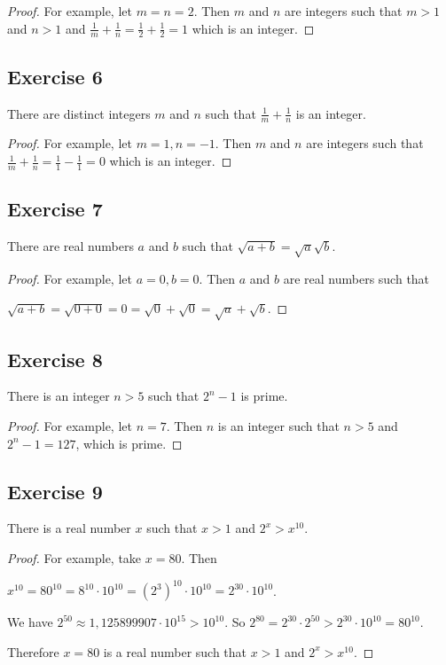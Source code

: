 \documentclass[14pt]{extarticle}
\begin{document}
\begin{proof}
For example, let $m = n = 2$. Then $m$ and $n$ are integers such that $m > 1$ and $n > 1$ and $\frac{1}{m} + \frac{1}{n} = \frac{1}{2} + \frac{1}{2} = 1$ which is an integer.
\end{proof}

\subsection{Exercise 6}
There are distinct integers $m$ and $n$ such that $\frac{1}{m} + \frac{1}{n}$ is an integer.

\begin{proof}
For example, let $m = 1, n = -1$. Then $m$ and $n$ are integers such that $\frac{1}{m} + \frac{1}{n} = \frac{1}{1} - \frac{1}{1} = 0$ which is an integer.
\end{proof}

\subsection{Exercise 7}
There are real numbers $a$ and $b$ such that $\sqrt{a+b} = \sqrt{a} \sqrt{b}$.

\begin{proof}
For example, let $a = 0, b = 0$. Then $a$ and $b$ are real numbers such that 

$\sqrt{a+b} = \sqrt{0+0} = 0 = \sqrt{0} + \sqrt{0} = \sqrt{a} + \sqrt{b}$.
\end{proof}

\subsection{Exercise 8}
There is an integer $n > 5$ such that $2^n - 1$ is prime.

\begin{proof}
For example, let $n = 7$. Then $n$ is an integer such that
$n > 5$ and $2^n - 1 = 127$, which is prime.
\end{proof}

\subsection{Exercise 9}
There is a real number $x$ such that $x > 1$ and $2^x > x^{10}$.

\begin{proof}
For example, take $x = 80$. Then 

$x^{10} = 80^{10} = 8^{10} \cdot 10^{10} = (2^3)^{10} \cdot 10^{10} = 2^{30} \cdot 10^{10}$.

We have $2^{50} \approx 1,125899907 \cdot 10^{15} > 10^{10}$. So $2^{80} = 2^{30} \cdot 2^{50} > 2^{30} \cdot 10^{10} = 80^{10}$.

Therefore $x = 80$ is a real number such that $x > 1$ and $2^x > x^{10}$.
\end{proof}
\end{document}
